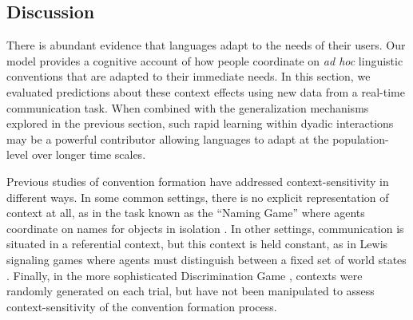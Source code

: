 %

\subsection{Discussion}

There is abundant evidence that languages adapt to the needs of their users.
Our model provides a cognitive account of how people coordinate on \emph{ad hoc} linguistic conventions that are adapted to their immediate needs.
In this section, we evaluated predictions about these context effects using new data from a real-time communication task.
When combined with the generalization mechanisms explored in the previous section, such rapid learning within dyadic interactions may be a powerful contributor allowing languages to adapt at the population-level over longer time scales.

Previous studies of convention formation have addressed context-sensitivity in different ways.
In some common settings, there is no explicit representation of context at all, as in the task known as the ``Naming Game'' where agents coordinate on names for objects in isolation \cite{steels2012experiments,baronchelli2008depth}. 
In other settings, communication is situated in a referential context, but this context is held constant, as in Lewis signaling games \cite{lewis_convention:_1969} where agents must distinguish between a fixed set of world states \cite{skyrms2010signals,BrunerEtAl14_LewisConventions}.
Finally, in the more sophisticated Discrimination Game \cite{steels2005coordinating,baronchelli2010modeling}, contexts were randomly generated on each trial, but have not been manipulated to assess context-sensitivity of the convention formation process.

